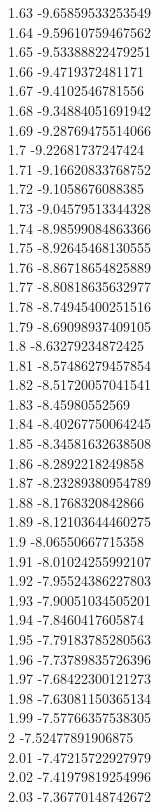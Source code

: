 {1.63	-9.65859533253549\\
1.64	-9.59610759467562\\
1.65	-9.53388822479251\\
1.66	-9.4719372481171\\
1.67	-9.4102546781556\\
1.68	-9.34884051691942\\
1.69	-9.28769475514066\\
1.7	-9.22681737247424\\
1.71	-9.16620833768752\\
1.72	-9.1058676088385\\
1.73	-9.04579513344328\\
1.74	-8.98599084863366\\
1.75	-8.92645468130555\\
1.76	-8.86718654825889\\
1.77	-8.80818635632977\\
1.78	-8.74945400251516\\
1.79	-8.69098937409105\\
1.8	-8.63279234872425\\
1.81	-8.57486279457854\\
1.82	-8.51720057041541\\
1.83	-8.45980552569\\
1.84	-8.40267750064245\\
1.85	-8.34581632638508\\
1.86	-8.2892218249858\\
1.87	-8.23289380954789\\
1.88	-8.1768320842866\\
1.89	-8.12103644460275\\
1.9	-8.06550667715358\\
1.91	-8.01024255992107\\
1.92	-7.95524386227803\\
1.93	-7.90051034505201\\
1.94	-7.8460417605874\\
1.95	-7.79183785280563\\
1.96	-7.73789835726396\\
1.97	-7.68422300121273\\
1.98	-7.63081150365134\\
1.99	-7.57766357538305\\
2	-7.52477891906875\\
2.01	-7.47215722927979\\
2.02	-7.41979819254996\\
2.03	-7.36770148742672\\
}
